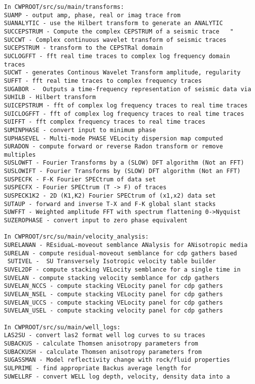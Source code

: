 {\begin{verbatim}
In CWPROOT/src/su/main/transforms:
SUAMP - output amp, phase, real or imag trace from			
SUANALYTIC - use the Hilbert transform to generate an ANALYTIC	
SUCCEPSTRUM - Compute the complex CEPSTRUM of a seismic trace 	"
SUCCWT - Complex continuous wavelet transform of seismic traces	
SUCEPSTRUM - transform to the CEPSTRal domain				
SUCLOGFFT - fft real time traces to complex log frequency domain traces
SUCWT - generates Continous Wavelet Transform amplitude, regularity	
SUFFT - fft real time traces to complex frequency traces		
SUGABOR -  Outputs a time-frequency representation of seismic data via
SUHILB - Hilbert transform					
SUICEPSTRUM - fft of complex log frequency traces to real time traces
SUICLOGFFT - fft of complex log frequency traces to real time traces
SUIFFT - fft complex frequency traces to real time traces	
SUMINPHASE - convert input to minimum phase				
SUPHASEVEL - Multi-mode PHASE VELocity dispersion map computed
SURADON - compute forward or reverse Radon transform or remove multiples
SUSLOWFT - Fourier Transforms by a (SLOW) DFT algorithm (Not an FFT)
SUSLOWIFT - Fourier Transforms by (SLOW) DFT algorithm (Not an FFT)
SUSPECFK - F-K Fourier SPECtrum of data set			
SUSPECFX - Fourier SPECtrum (T -> F) of traces 		
SUSPECK1K2 - 2D (K1,K2) Fourier SPECtrum of (x1,x2) data set		
SUTAUP - forward and inverse T-X and F-K global slant stacks		
SUWFFT - Weighted amplitude FFT with spectrum flattening 0->Nyquist	
SUZEROPHASE - convert input to zero phase equivalent			

In CWPROOT/src/su/main/velocity_analysis:
SURELANAN - REsiduaL-moveout semblance ANalysis for ANisotropic media	
SURELAN - compute residual-moveout semblance for cdp gathers based	
 SUTIVEL -  SU Transversely Isotropic velocity table builder		
SUVEL2DF - compute stacking VELocity semblance for a single time in   
SUVELAN - compute stacking velocity semblance for cdp gathers		     
SUVELAN_NCCS - compute stacking VELocity panel for cdp gathers	     
SUVELAN_NSEL - compute stacking VELocity panel for cdp gathers	     
SUVELAN_UCCS - compute stacking VELocity panel for cdp gathers	     
SUVELAN_USEL - compute stacking velocity panel for cdp gathers	     

In CWPROOT/src/su/main/well_logs:
LAS2SU - convert las2 format well log curves to su traces	
SUBACKUS - calculate Thomsen anisotropy parameters from 	
SUBACKUSH - calculate Thomsen anisotropy parameters from 	
SUGASSMAN - Model reflectivity change with rock/fluid properties	
SULPRIME - find appropriate Backus average length for  	
SUWELLRF - convert WELL log depth, velocity, density data into a	


\end{verbatim}}

